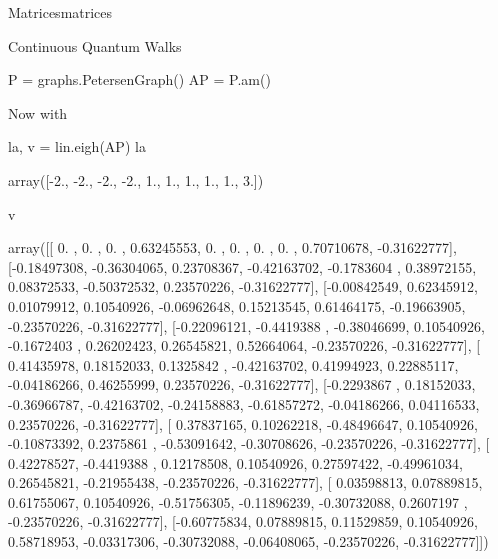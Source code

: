 \begin{chap}{Matrices}{matrices}
\begin{sect}{Continuous Quantum Walks}
\begin{sagecode}
\begin{sageinput}
P = graphs.PetersenGraph()
AP = P.am()
\end{sageinput}
\begin{sageoutput}
\end{sageoutput}
\end{sagecode}
%
\begin{para}
Now with
\end{para}
%
\begin{sagecode}
\begin{sageinput}
la, v = lin.eigh(AP)
la
\end{sageinput}
\begin{sageoutput}
array([-2., -2., -2., -2.,  1.,  1.,  1.,  1.,  1.,  3.])
\end{sageoutput}
\end{sagecode}
%
\begin{sagecode}
\begin{sageinput}
v
\end{sageinput}
\begin{sageoutput}
array([[ 0.        ,  0.        ,  0.        ,  0.63245553,  0.        ,
         0.        ,  0.        ,  0.        ,  0.70710678, -0.31622777],
       [-0.18497308, -0.36304065,  0.23708367, -0.42163702, -0.1783604 ,
         0.38972155,  0.08372533, -0.50372532,  0.23570226, -0.31622777],
       [-0.00842549,  0.62345912,  0.01079912,  0.10540926, -0.06962648,
         0.15213545,  0.61464175, -0.19663905, -0.23570226, -0.31622777],
       [-0.22096121, -0.4419388 , -0.38046699,  0.10540926, -0.1672403 ,
         0.26202423,  0.26545821,  0.52664064, -0.23570226, -0.31622777],
       [ 0.41435978,  0.18152033,  0.1325842 , -0.42163702,  0.41994923,
         0.22885117, -0.04186266,  0.46255999,  0.23570226, -0.31622777],
       [-0.2293867 ,  0.18152033, -0.36966787, -0.42163702, -0.24158883,
        -0.61857272, -0.04186266,  0.04116533,  0.23570226, -0.31622777],
       [ 0.37837165,  0.10262218, -0.48496647,  0.10540926, -0.10873392,
         0.2375861 , -0.53091642, -0.30708626, -0.23570226, -0.31622777],
       [ 0.42278527, -0.4419388 ,  0.12178508,  0.10540926,  0.27597422,
        -0.49961034,  0.26545821, -0.21955438, -0.23570226, -0.31622777],
       [ 0.03598813,  0.07889815,  0.61755067,  0.10540926, -0.51756305,
        -0.11896239, -0.30732088,  0.2607197 , -0.23570226, -0.31622777],
       [-0.60775834,  0.07889815,  0.11529859,  0.10540926,  0.58718953,
        -0.03317306, -0.30732088, -0.06408065, -0.23570226, -0.31622777]])
\end{sageoutput}
\end{sagecode}

\end{sect}
\end{chap}
